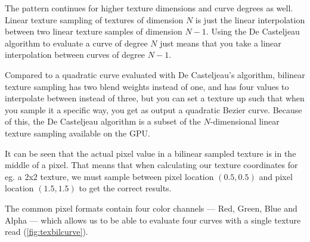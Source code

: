 \documentclass{jcgt}
\begin{document}
The pattern continues for higher texture dimensions and curve degrees as well.  Linear texture sampling of textures of dimension $N$ is just the linear interpolation between two linear texture samples of dimension $N-1$.  Using the De Casteljeau algorithm to evaluate a curve of degree $N$ just means that you take a linear interpolation between curves of degree $N-1$.

Compared to a quadratic curve evaluated with De Casteljeau's algorithm, bilinear texture sampling has two blend weights instead of one, and has four values to interpolate between instead of three, but you can set a texture up such that when you sample it a specific way, you get as output a quadratic Bezier curve.  Because of this, the De Casteljeau algorithm is a subset of the $N$-dimensional linear texture sampling available on the GPU.

It can be seen that the actual pixel value in a bilinear sampled texture is in the middle of a pixel.  That means that when calculating our texture coordinates for eg. a 2x2 texture, we must sample between pixel location $(0.5,0.5)$ and pixel location $(1.5,1.5)$ to get the correct results.

The common pixel formats contain four color channels –-- Red, Green, Blue and Alpha –-- which allows us to be able to evaluate four curves with a single texture read (\autoref{fig:texbilcurve}).
\end{document}

